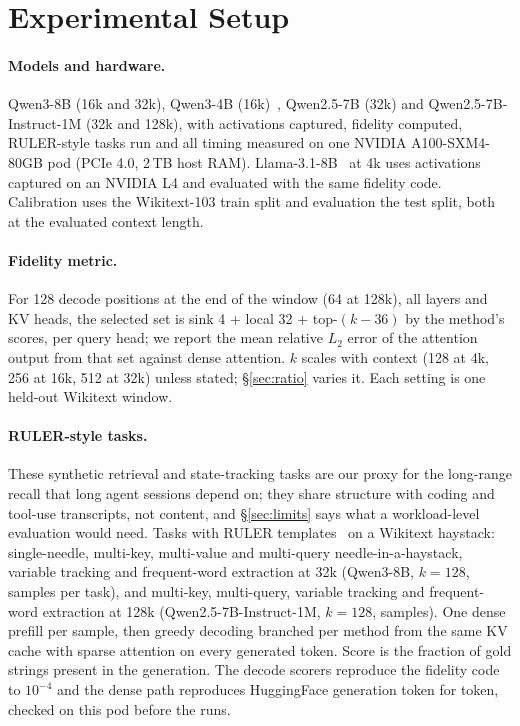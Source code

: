 \documentclass[10pt,twocolumn]{article}
\begin{document}
\section{Experimental Setup}\label{sec:setup}
\paragraph{Models and hardware.} Qwen3-8B (16k and 32k), Qwen3-4B (16k)~\cite{qwen3}, Qwen2.5-7B (32k) and Qwen2.5-7B-Instruct-1M (32k and 128k), with activations captured, fidelity computed, RULER-style tasks run and all timing measured on one NVIDIA A100-SXM4-80GB pod (PCIe 4.0, 2\,TB host RAM). Llama-3.1-8B~\cite{llama3} at 4k uses activations captured on an NVIDIA L4 and evaluated with the same fidelity code. Calibration uses the Wikitext-103 train split and evaluation the test split, both at the evaluated context length.

\paragraph{Fidelity metric.} For 128 decode positions at the end of the window (64 at 128k), all layers and KV heads, the selected set is sink 4 + local 32 + top-$(k-36)$ by the method's scores, per query head; we report the mean relative $L_2$ error of the attention output from that set against dense attention. $k$ scales with context (128 at 4k, 256 at 16k, 512 at 32k) unless stated; \S\ref{sec:ratio} varies it. Each setting is one held-out Wikitext window.

\paragraph{RULER-style tasks.} These synthetic retrieval and state-tracking tasks are our proxy for the long-range recall that long agent sessions depend on; they share structure with coding and tool-use transcripts, not content, and \S\ref{sec:limits} says what a workload-level evaluation would need. Tasks with RULER templates~\cite{ruler} on a Wikitext haystack: single-needle, multi-key, multi-value and multi-query needle-in-a-haystack, variable tracking and frequent-word extraction at 32k (Qwen3-8B, $k=128$,  samples per task), and multi-key, multi-query, variable tracking and frequent-word extraction at 128k (Qwen2.5-7B-Instruct-1M, $k=128$,  samples). One dense prefill per sample, then greedy decoding branched per method from the same KV cache with sparse attention on every generated token. Score is the fraction of gold strings present in the generation. The decode scorers reproduce the fidelity code to $10^{-4}$ and the dense path reproduces HuggingFace generation token for token, checked on this pod before the runs.
\end{document}
